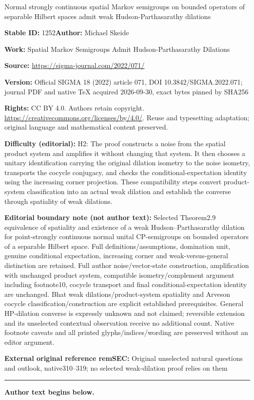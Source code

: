 \documentclass[11pt]{article}
\numberwithin{equation}{section}
\numberwithin{equation}{section}
\begin{document}
\begin{center}\Large Normal strongly continuous spatial Markov semigroups on bounded operators of separable Hilbert spaces admit weak Hudson-Parthasarathy dilations\end{center}
\noindent\textbf{Stable ID:} 1252\quad\textbf{Author:} Michael Skeide\par
\noindent\textbf{Work:} Spatial Markov Semigroups Admit Hudson-Parthasarathy Dilations\par
\noindent\textbf{Source:} \url{https://sigma-journal.com/2022/071/}\par
\noindent\textbf{Version:} Official SIGMA 18 (2022) article 071, DOI 10.3842/SIGMA.2022.071; journal PDF and native TeX acquired 2026-09-30, exact bytes pinned by SHA256\par
\noindent\textbf{Rights:} CC BY 4.0. Authors retain copyright. \url{https://creativecommons.org/licenses/by/4.0/}. Reuse and typesetting adaptation; original language and mathematical content preserved.\par
\noindent\textbf{Difficulty (editorial):} {\CJKfont H2: The proof constructs a noise from the spatial product system and amplifies it without changing that system. It then chooses a unitary identification carrying the original dilation isometry to the noise isometry, transports the cocycle conjugacy, and checks the conditional-expectation identity using the increasing corner projection. These compatibility steps convert product-system classification into an actual weak dilation and establish the converse through spatiality of weak dilations.}\par
\medskip\noindent\textbf{Editorial boundary note (not author text):} Selected Theorem2.9 equivalence of spatiality and existence of a weak Hudson–Parthasarathy dilation for point-strongly continuous normal unital CP-semigroups on bounded operators of a separable Hilbert space. Full definitions/assumptions, domination unit, genuine conditional expectation, increasing corner and weak-versus-general distinction are retained. Full author noise/vector-state construction, amplification with unchanged product system, compatible isometry/complement argument including footnote10, cocycle transport and final conditional-expectation identity are unchanged. Bhat weak dilations/product-system spatiality and Arveson cocycle classification/construction are explicit established prerequisites. General HP-dilation converse is expressly unknown and not claimed; reversible extension and its unselected contextual observation receive no additional count. Native footnote caveats and all printed glyphs/indices/wording are preserved without an editor argument.\par
\noindent\textbf{External original reference remSEC:} Original unselected natural questions and outlook, native310–319; no selected weak-dilation proof relies on them\par
\medskip\hrule\medskip\noindent\textbf{Author text begins below.}\par
\end{document}
